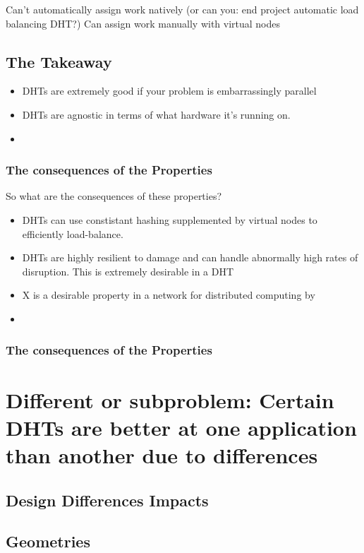 \documentclass[10pt,letterpaper]{report}
\begin{document}
Can't automatically assign work natively (or can you: end project automatic load balancing DHT?)
Can assign work manually with virtual nodes 



\subsection{The Takeaway}


\begin{itemize}
	\item DHTs are extremely good if your problem is embarrassingly parallel
	\item DHTs are agnostic in terms of what hardware it's running on.
	\item
\end{itemize}
\subsubsection{The consequences of the Properties}
So what are the consequences of these properties?
\begin{itemize}
    \item DHTs can use constistant hashing supplemented by virtual nodes to efficiently load-balance.
	\item DHTs are highly resilient to damage and can handle abnormally high rates of disruption.  This is extremely desirable in a DHT
	\item X is a desirable property in a network for distributed computing by
	\item 
\end{itemize}


\subsubsection{The consequences of the Properties}


\section{Different or subproblem: Certain DHTs are better at one application than another due to differences}
\subsection{Design Differences Impacts}
\subsection{Geometries}
\end{document}
